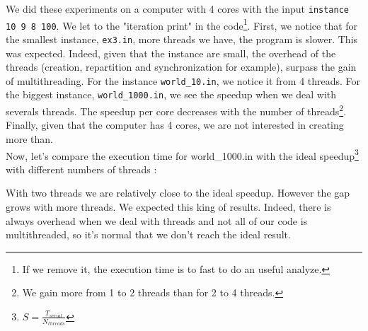 \documentclass[a4paper,10pt]{article}
\begin{document}
We did these experiments on a computer with 4 cores with the input \texttt{instance 10 9 8 100}. We
let to the "iteration print" in the code\footnote{If we remove it, the execution time is to fast to do an useful analyze.}.
First, we notice that for the smallest instance, \texttt{ex3.in},
more threads we have, the program is slower. This was expected. Indeed, given that the instance are small, the overhead of the threads (creation, repartition and
synchronization for example), surpass the gain of multithreading.
For the instance \texttt{world\_10.in}, we notice it from 4 threads.
For the biggest instance, \texttt{world\_1000.in}, we see the speedup when we deal with severals threads. The speedup per core decreases with the number
of threads\footnote{We gain more from 1 to 2 threads than for 2 to 4 threads.}.
Finally, given that the computer has 4 cores, we are not interested in creating more than.
\\

Now, let's compare the execution time for  world\_1000.in with the ideal speedup\footnote{$S = \frac{T_{serial}}{N_{threads}}$}
with different numbers of threads :



With two threads we are relatively close to the ideal speedup. However the gap grows with more threads. We expected this king of results.
Indeed, there is always overhead when we deal with threads and not all of our code is multithreaded, so it's normal that we don't reach
the ideal result.
\end{document}
